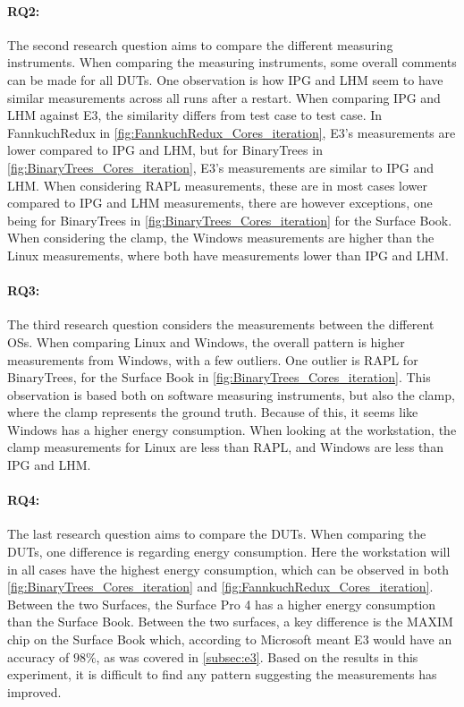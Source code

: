 \paragraph*{RQ2:} The second research question aims to compare the different measuring instruments. When comparing the measuring instruments, some overall comments can be made for all DUTs. One observation is how IPG and LHM seem to have similar measurements across all runs after a restart. When comparing IPG and LHM against E3, the similarity differs from test case to test case. In FannkuchRedux in \cref{fig:FannkuchRedux_Cores_iteration}, E3's measurements are lower compared to IPG and LHM, but for BinaryTrees in \cref{fig:BinaryTrees_Cores_iteration}, E3's measurements are similar to IPG and LHM. When considering RAPL measurements, these are in most cases lower compared to IPG and LHM measurements, there are however exceptions, one being for BinaryTrees in \cref*{fig:BinaryTrees_Cores_iteration} for the Surface Book. When considering the clamp, the Windows measurements are higher than the Linux measurements, where both have measurements lower than IPG and LHM. 



\paragraph*{RQ3:} The third research question considers the measurements between the different OSs. When comparing Linux and Windows, the overall pattern is higher measurements from Windows, with a few outliers. One outlier is RAPL for BinaryTrees, for the Surface Book in \cref{fig:BinaryTrees_Cores_iteration}. This observation is based both on software measuring instruments, but also the clamp, where the clamp represents the ground truth. Because of this, it seems like Windows has a higher energy consumption. When looking at the workstation, the clamp measurements for Linux are less than RAPL, and Windows are less than IPG and LHM.

\paragraph*{RQ4:} The last research question aims to compare the DUTs. When comparing the DUTs, one difference is regarding energy consumption. Here the workstation will in all cases have the highest energy consumption, which can be observed in both \cref*{fig:BinaryTrees_Cores_iteration} and \cref*{fig:FannkuchRedux_Cores_iteration}. Between the two Surfaces, the Surface Pro 4 has a higher energy consumption than the Surface Book. Between the two surfaces, a key difference is the MAXIM chip on the Surface Book which, according to Microsoft meant E3 would have an accuracy of $98\%$, as was covered in \cref*{subsec:e3}. Based on the results in this experiment, it is difficult to find any pattern suggesting the measurements has improved.

